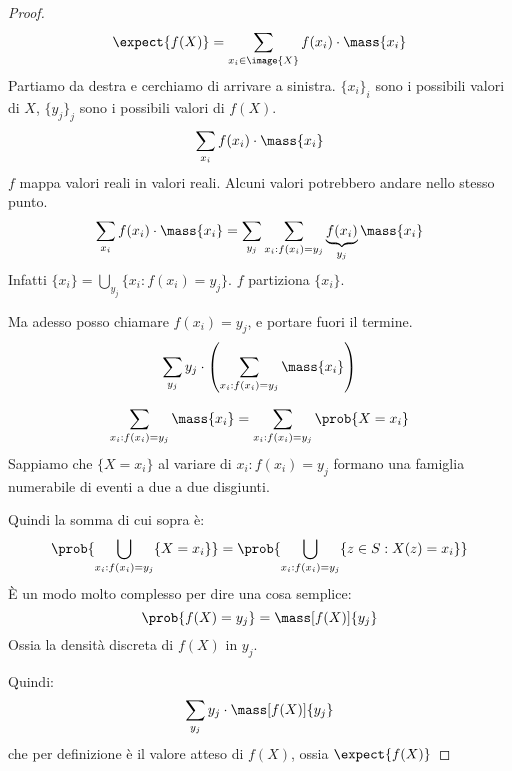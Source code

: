 \begin{proof}
\[
\expect{f(X)} = \sum_{x_i \in \image{X}} f(x_i) \cdot \mass{x_i}
\]
Partiamo da destra e cerchiamo di arrivare a sinistra. $\{ x_i \}_i$ sono i possibili valori di $X$, $\{ y_j \}_j$ sono i possibili valori di $f(X)$.
\[
\sum_{x_i} f(x_i) \cdot \mass{x_i}
\]
$f$ mappa valori reali in valori reali. Alcuni valori potrebbero andare nello stesso punto.
\[
\sum_{x_i} f(x_i) \cdot \mass{x_i} =
\sum_{y_j} \sum_{x_i : f(x_i) = y_j} \underbrace{f(x_i)}_{y_j} \mass{x_i}
\]
Infatti $\{x_i\} = \bigcup_{y_j} \{x_i : f(x_i) = y_j \}$. $f$ partiziona $\{ x_i \}$.

Ma adesso posso chiamare $f(x_i) = y_j$, e portare fuori il termine.
\[
\sum_{y_j} y_j \cdot \left( \sum_{x_i : f(x_i) = y_j} \mass{x_i} \right)
\]
\begin{oss}
\[
\sum_{x_i : f(x_i) = y_j} \mass{x_i} = \sum_{x_i : f(x_i) = y_j} \prob{X = x_i}
\]
Sappiamo che $\{X = x_i\}$ al variare di $x_i : f(x_i) = y_j$ formano una famiglia numerabile di eventi a due a due disgiunti.

Quindi la somma di cui sopra \`e:
\[
\prob{\bigcup_{x_i : f(x_i) = y_j} \{X = x_i\}} =
\prob{\bigcup_{x_i : f(x_i) = y_j} \{z \in S : X(z) = x_i\}}
\]
\`E un modo molto complesso per dire una cosa semplice:
\[
\prob{f(X) = y_j} = \mass[f(X)]{y_j}
\]
Ossia la densit\`a discreta di $f(X)$ in $y_j$.
\end{oss}
Quindi:
\[
\sum_{y_j} y_j \cdot \mass[f(X)]{y_j}
\]
che per definizione \`e il valore atteso di $f(X)$, ossia $\expect{f(X)}$
\end{proof}

